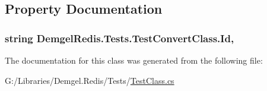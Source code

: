 \subsection{Property Documentation}
\hypertarget{class_demgel_redis_1_1_tests_1_1_test_convert_class_a147b72b51c19529ca603b84b3410ad3e}{}
\subsubsection[{Id}]{\setlength{\rightskip}{0pt plus 5cm}string Demgel\+Redis.\+Tests.\+Test\+Convert\+Class.\+Id\hspace{0.3cm}{\ttfamily [get]}, {\ttfamily [set]}}\label{class_demgel_redis_1_1_tests_1_1_test_convert_class_a147b72b51c19529ca603b84b3410ad3e}


The documentation for this class was generated from the following file\+:\begin{DoxyCompactItemize}
\item 
G\+:/\+Libraries/\+Demgel.\+Redis/\+Tests/\hyperlink{_test_class_8cs}{Test\+Class.\+cs}\end{DoxyCompactItemize}

